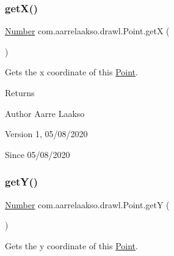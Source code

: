 \subsubsection{\texorpdfstring{get\+X()}{getX()}}
{\footnotesize\ttfamily \hyperlink{interfacecom_1_1aarrelaakso_1_1drawl_1_1_number}{Number} com.\+aarrelaakso.\+drawl.\+Point.\+getX (\begin{DoxyParamCaption}{ }\end{DoxyParamCaption})\hspace{0.3cm}{\ttfamily [protected]}}



Gets the x coordinate of this \hyperlink{classcom_1_1aarrelaakso_1_1drawl_1_1_point}{Point}. 

\begin{DoxyReturn}{Returns}

\end{DoxyReturn}
\begin{DoxyAuthor}{Author}
Aarre Laakso 
\end{DoxyAuthor}
\begin{DoxyVersion}{Version}
1, 05/08/2020 
\end{DoxyVersion}
\begin{DoxySince}{Since}
05/08/2020 
\end{DoxySince}
\mbox{\label{classcom_1_1aarrelaakso_1_1drawl_1_1_point_a8247f55c36600e067be27a1586255767}} 
\subsubsection{\texorpdfstring{get\+Y()}{getY()}}
{\footnotesize\ttfamily \hyperlink{interfacecom_1_1aarrelaakso_1_1drawl_1_1_number}{Number} com.\+aarrelaakso.\+drawl.\+Point.\+getY (\begin{DoxyParamCaption}{ }\end{DoxyParamCaption})\hspace{0.3cm}{\ttfamily [protected]}}



Gets the y coordinate of this \hyperlink{classcom_1_1aarrelaakso_1_1drawl_1_1_point}{Point}. 

